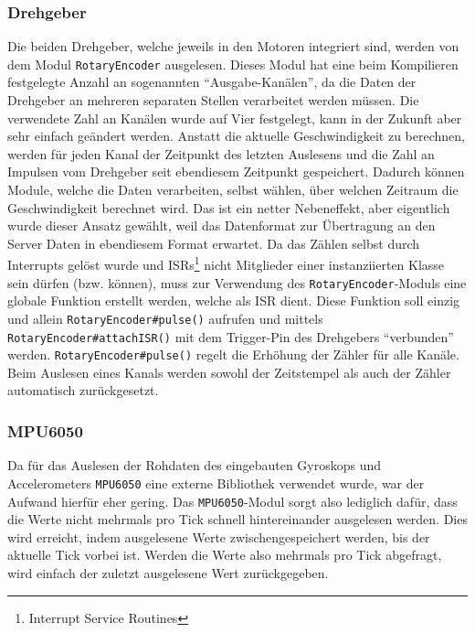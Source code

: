 \subsubsection{Drehgeber}
Die beiden Drehgeber,
welche jeweils in den Motoren integriert sind,
werden von dem Modul \texttt{RotaryEncoder} ausgelesen.
%
Dieses Modul hat eine beim Kompilieren festgelegte Anzahl an sogenannten ``Ausgabe-Kanälen'',
da die Daten der Drehgeber an mehreren separaten Stellen verarbeitet werden müssen.
%
Die verwendete Zahl an Kanälen wurde auf Vier festgelegt, kann in der Zukunft aber sehr einfach geändert werden.
%
Anstatt die aktuelle Geschwindigkeit zu berechnen,
werden für jeden Kanal der Zeitpunkt des letzten Auslesens
und die Zahl an Impulsen vom Drehgeber seit ebendiesem Zeitpunkt gespeichert.
%
Dadurch können Module, welche die Daten verarbeiten,
selbst wählen, über welchen Zeitraum die Geschwindigkeit berechnet wird.
%
Das ist ein netter Nebeneffekt, aber eigentlich wurde dieser Ansatz gewählt,
weil das Datenformat zur Übertragung an den Server Daten in ebendiesem Format erwartet.
%
Da das Zählen selbst durch Interrupts gelöst wurde
und ISRs\footnote{Interrupt Service Routines}
nicht Mitglieder einer instanziierten Klasse sein dürfen (bzw. können),
muss zur Verwendung des \texttt{RotaryEncoder}-Moduls eine globale Funktion erstellt werden,
welche als ISR dient.
Diese Funktion soll einzig und allein \texttt{RotaryEncoder\#pulse()} aufrufen
und mittels \texttt{RotaryEncoder\#attachISR()} mit dem Trigger-Pin des Drehgebers ``verbunden'' werden.
%
\texttt{RotaryEncoder\#pulse()} regelt die Erhöhung der Zähler für alle Kanäle.
%
Beim Auslesen eines Kanals werden sowohl der Zeitstempel als auch der Zähler automatisch zurückgesetzt.

\subsubsection{MPU6050}
Da für das Auslesen der Rohdaten des eingebauten Gyroskops und Accelerometers
\texttt{MPU6050} eine externe Bibliothek \cite{adafruit-mpu6050} verwendet wurde,
war der Aufwand hierfür eher gering.
%
Das \texttt{MPU6050}-Modul sorgt also lediglich dafür,
dass die Werte nicht mehrmals pro Tick schnell hintereinander ausgelesen werden.
%
Dies wird erreicht,
indem ausgelesene Werte zwischengespeichert werden,
bis der aktuelle Tick vorbei ist.
%
Werden die Werte also mehrmals pro Tick abgefragt,
wird einfach der zuletzt ausgelesene Wert zurückgegeben.

